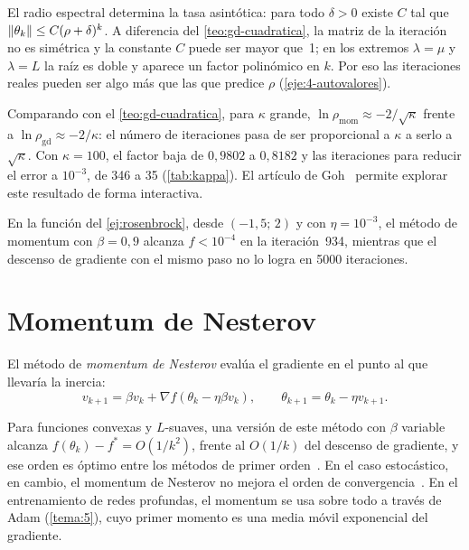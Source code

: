 \begin{observacion}
El radio espectral determina la tasa asintótica: para todo $\delta>0$ existe $C$ tal que $\lVert\theta_k\rVert\le C(\rho+\delta)^{k}$. A diferencia del \cref{teo:gd-cuadratica}, la matriz de la iteración no es simétrica y la constante $C$ puede ser mayor que~1; en los extremos $\lambda=\mu$ y $\lambda=L$ la raíz es doble y aparece un factor polinómico en $k$. Por eso las iteraciones reales pueden ser algo más que las que predice $\rho$ (\cref{eje:4-autovalores}).
\end{observacion}

Comparando con el \cref{teo:gd-cuadratica}, para $\kappa$ grande, $\ln\rho_{\text{mom}}\approx -2/\sqrt\kappa$ frente a $\ln\rho_{\text{gd}}\approx -2/\kappa$: el número de iteraciones pasa de ser proporcional a $\kappa$ a serlo a $\sqrt\kappa$. Con $\kappa=100$, el factor baja de $0{,}9802$ a $0{,}8182$ y las iteraciones para reducir el error a $10^{-3}$, de 346 a 35 (\cref{tab:kappa}). El artículo de Goh~\cite{goh} permite explorar este resultado de forma interactiva.

\begin{ejemplo}[Rosenbrock]
En la función del \cref{ej:rosenbrock}, desde $(-1{,}5;\,2)$ y con $\eta=10^{-3}$, el método de momentum con $\beta=0{,}9$ alcanza $f<10^{-4}$ en la iteración~934, mientras que el descenso de gradiente con el mismo paso no lo logra en 5000 iteraciones.
\end{ejemplo}

\section{Momentum de Nesterov}

\begin{definicion}
El método de \emph{momentum de Nesterov} evalúa el gradiente en el punto al que llevaría la inercia:
\[
v_{k+1}=\beta v_k+\nabla f(\theta_k-\eta\beta v_k),\qquad\theta_{k+1}=\theta_k-\eta v_{k+1}.
\]
\end{definicion}

Para funciones convexas y $L$-suaves, una versión de este método con $\beta$ variable alcanza $f(\theta_k)-f^{\ast}=O(1/k^{2})$, frente al $O(1/k)$ del descenso de gradiente, y ese orden es óptimo entre los métodos de primer orden~\cite{nesterov}. En el caso estocástico, en cambio, el momentum de Nesterov no mejora el orden de convergencia~\cite[§8.3.3]{gbc}. En el entrenamiento de redes profundas, el momentum se usa sobre todo a través de Adam (\cref{tema:5}), cuyo primer momento es una media móvil exponencial del gradiente.

